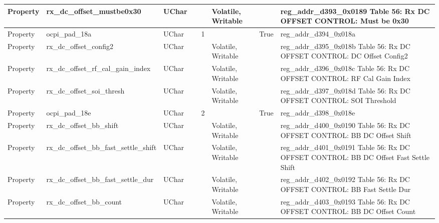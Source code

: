 \documentclass{article}
\begin{document}
\begin{scriptsize}
\begin{longtable}{|p{2cm}|p{5cm}|p{1cm}|p{2cm}|p{2cm}|p{1.75cm}|p{1.5cm}|p{5.1cm}|}
  \hline
  Property & rx\_dc\_offset\_mustbe0x30                               & UChar &                  &                  & Volatile,  Writable &         & reg\_addr\_d393\_0x0189 Table 56: Rx DC OFFSET CONTROL: Must be 0x30 \\
  \hline
  Property & ocpi\_pad\_18a                                           & UChar &                  & 1                &                     & True    & reg\_addr\_d394\_0x018a \\
  \hline
  Property & rx\_dc\_offset\_config2                                  & UChar &                  &                  & Volatile,  Writable &         & reg\_addr\_d395\_0x018b Table 56: Rx DC OFFSET CONTROL: DC Offset Config2 \\
  \hline
  Property & rx\_dc\_offset\_rf\_cal\_gain\_index                     & UChar &                  &                  & Volatile,  Writable &         & reg\_addr\_d396\_0x018c Table 56: Rx DC OFFSET CONTROL: RF Cal Gain Index \\
  \hline
  Property & rx\_dc\_offset\_soi\_thresh                              & UChar &                  &                  & Volatile,  Writable &         & reg\_addr\_d397\_0x018d Table 56: Rx DC OFFSET CONTROL: SOI Threshold \\
  \hline
  Property & ocpi\_pad\_18e                                           & UChar &                  & 2                &                     & True    & reg\_addr\_d398\_0x018e \\
  \hline
  Property & rx\_dc\_offset\_bb\_shift                                & UChar &                  &                  & Volatile,  Writable &         & reg\_addr\_d400\_0x0190 Table 56: Rx DC OFFSET CONTROL: BB DC Offset Shift \\
  \hline
  Property & rx\_dc\_offset\_bb\_fast\_settle\_shift                  & UChar &                  &                  & Volatile,  Writable &         & reg\_addr\_d401\_0x0191 Table 56: Rx DC OFFSET CONTROL: BB DC Offset Fast Settle Shift \\
  \hline
  Property & rx\_dc\_offset\_bb\_fast\_settle\_dur                    & UChar &                  &                  & Volatile,  Writable &         & reg\_addr\_d402\_0x0192 Table 56: Rx DC OFFSET CONTROL: BB Fast Settle Dur \\
  \hline
  Property & rx\_dc\_offset\_bb\_count                                & UChar &                  &                  & Volatile,  Writable &         & reg\_addr\_d403\_0x0193 Table 56: Rx DC OFFSET CONTROL: BB DC Offset Count \\

\end{longtable}
\end{scriptsize}
\end{document}
